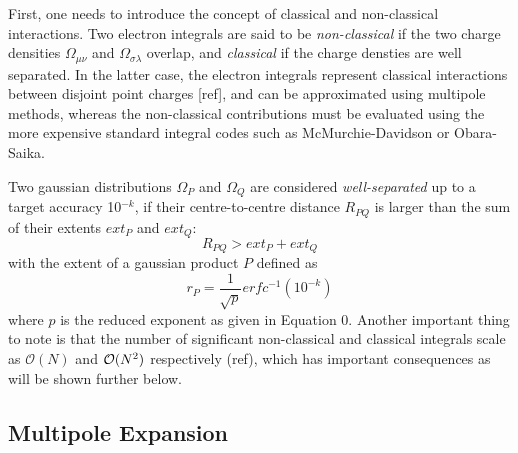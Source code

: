 First, one needs to introduce the concept of classical and non-classical interactions. Two electron integrals are said to be \emph{non-classical} if the two charge densities $\Omega_{\mu\nu}$ and $\Omega_{\sigma\lambda}$ overlap, and \emph{classical} if the charge densties are well separated. In the latter case, the electron integrals represent classical interactions between disjoint point charges [ref], and can be approximated using multipole methods, whereas the non-classical contributions must be evaluated using the more expensive standard integral codes such as McMurchie-Davidson or Obara-Saika. 

Two gaussian distributions $\Omega_P$ and $\Omega_Q$ are considered \emph{well-separated} up to a target accuracy 10$^{-k}$, if their centre-to-centre distance $R_{PQ}$ is larger than the sum of their extents $ext_P$ and $ext_Q$:
\begin{equation}
R_{PQ} > ext_P + ext_Q
\end{equation} 
\noindent with the extent of a gaussian product $P$ defined as 
\begin{equation}
r_P = \frac{1}{\sqrt{p}} erfc^{-1}(10^{-k})
\end{equation}
\noindent where $p$ is the reduced exponent as given in Equation 0. Another important thing to note is that the number of significant non-classical and classical integrals scale as $\mathcal{O}(N)$ and $\mathcal{O}(N^{2})$ respectively (ref), which has important consequences as will be shown further below. 

\subsection{Multipole Expansion}

